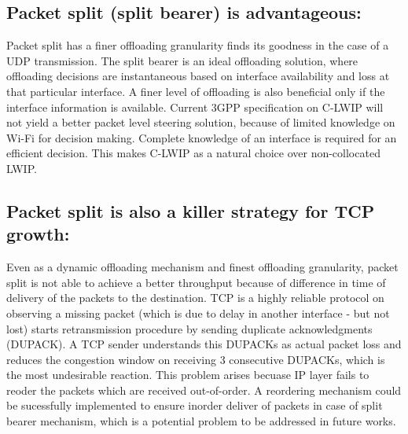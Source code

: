 \documentclass[conference]{IEEEtran}
\begin{document}
\subsection{Packet split (split bearer) is advantageous:} Packet split has a finer offloading granularity finds its goodness in the case of a UDP transmission. The split bearer is an ideal offloading solution, where offloading decisions are instantaneous based on interface availability and loss at that particular interface. A finer level of offloading is also beneficial only if the interface information is available. Current 3GPP specification on C-LWIP will not yield a better packet level steering solution, because of limited knowledge on Wi-Fi for decision making. Complete knowledge of an interface is required for an efficient decision. This makes C-LWIP as a natural choice over non-collocated LWIP.
\subsection{Packet split is also a killer strategy for TCP growth:} Even as a dynamic offloading mechanism and finest offloading granularity, packet split is not able to achieve a better throughput because of difference in time of delivery of the packets to the destination. TCP is a highly reliable protocol on observing a missing packet (which is due to delay in another interface - but not lost) starts retransmission procedure by sending duplicate acknowledgments (DUPACK). A TCP sender understands this DUPACKs as actual packet loss and reduces the congestion window on receiving 3 consecutive DUPACKs, which is the most undesirable reaction. This problem arises becuase IP layer fails to reoder the packets which are received out-of-order. A reordering mechanism could be sucessfully implemented to ensure inorder deliver of packets in case of split bearer mechanism, which is a potential problem to be addressed in future works.  
%
%
\end{document}

